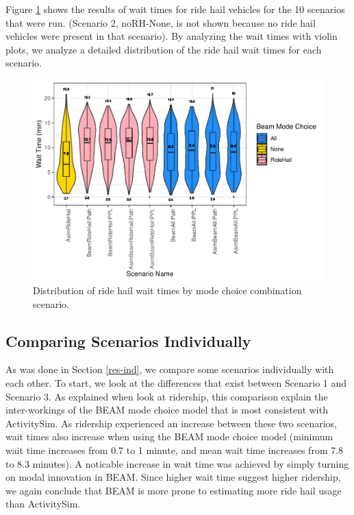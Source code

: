 \documentclass[12pt, oneside, openright]{byuthesis}
\begin{document}
Figure \ref{fig:waits} shows the results of wait times for ride hail vehicles for the 10 scenarios that were run. (Scenario 2, noRH-None, is not shown because no ride hail vehicles were present in that scenario). By analyzing the wait times with violin plots, we analyze a detailed distribution of the ride hail wait times for each scenario.

\begin{figure}

{\centering \includegraphics{thesis_files/figure-latex/waits-1} 

}

\caption{Distribution of ride hail wait times by mode choice combination scenario.}\label{fig:waits}
\end{figure}

\hypertarget{comparing-scenarios-individually}{%
\subsection{Comparing Scenarios Individually}\label{comparing-scenarios-individually}}

As was done in Section \ref{res-ind}, we compare some scenarios individually with each other. To start, we look at the differences that exist between Scenario 1 and Scenario 3. As explained when look at ridership, this comparison explain the inter-workings of the BEAM mode choice model that is most consistent with ActivitySim. As ridership experienced an increase between these two scenarios, wait times also increase when using the BEAM mode choice model (minimum wait time increases from 0.7 to 1 minute, and mean wait time increases from 7.8 to 8.3 minutes). A noticable increase in wait time was achieved by simply turning on modal innovation in BEAM. Since higher wait time suggest higher ridership, we again conclude that BEAM is more prone to estimating more ride hail usage than ActivitySim.
\end{document}
